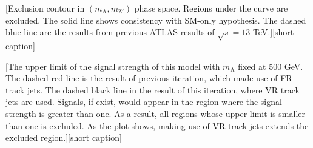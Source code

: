 \documentclass[class=NCU_thesis, crop=false]{standalone}
\begin{document}
		[Exclusion contour in $(m_{\mathrm{A}}, m_{\mathrm{Z'}})$ phase space. Regions under the curve are excluded. The solid line shows consistency with SM-only hypothesis. The dashed blue line are the results from previous ATLAS results of $\sqrt{s} = 13$ TeV.][short caption]

		[The upper limit of the signal strength of this model with $m_{\mathrm{A}}$ fixed at 500 GeV. The dashed red line is the result of previous iteration, which made use of FR track jets. The dashed black line in the result of this iteration, where VR track jets are used. Signals, if exist, would appear in the region where the signal strength is greater than one. As a result, all regions whose upper limit is smaller than one is excluded. As the plot shows, making use of VR track jets extends the excluded region.][short caption]
		
\end{document}
